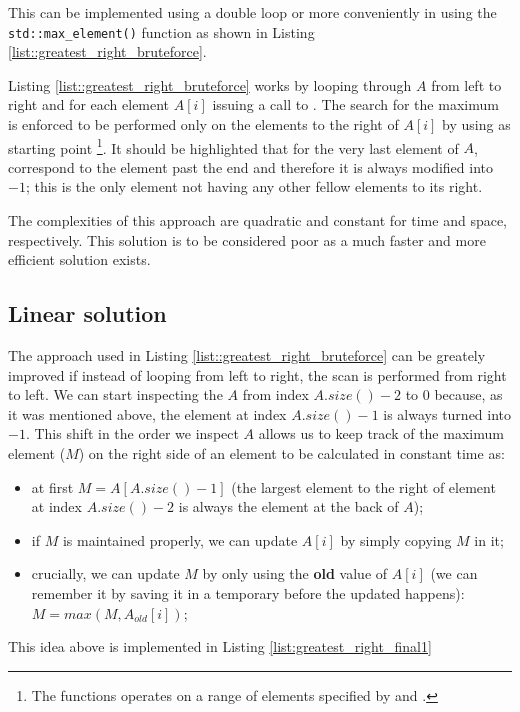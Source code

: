 This can be implemented using a double loop or more conveniently in \CC using the \texttt{std::max\_element()} function as shown in Listing \ref{list::greatest_right_bruteforce}. 



Listing \ref{list::greatest_right_bruteforce} works by looping through $A$ from left to right and for each element $A[i]$ issuing a call to . The search for the maximum is enforced to be performed only on the elements to the right of $A[i]$ by using as starting point \footnote{The  functions operates on a range of elements specified by  and  \cite{cit::std::maxelement}.}.
It should be highlighted that for the very last element of $A$,  correspond to the element past the end and therefore it is always modified into $-1$; this is the only element not having any other fellow elements to its right.

The complexities of this approach are quadratic and constant for time and space, respectively. 
This solution is to be considered poor as a much faster and more efficient solution exists.

\subsection{Linear solution}
\label{sec:greatest_right:linear}
The approach used in Listing \ref{list::greatest_right_bruteforce} can be greately improved if instead of looping from left to right, the scan is performed from right to left.
We can start inspecting the $A$ from index $A.size()-2$ to $0$ because, as it was mentioned above, the  element at index $A.size()-1$ is always turned into $-1$. 
This shift in the order we inspect $A$ allows us to keep track of the maximum element ($M$) on the right side of an element to be calculated in constant time as:
\begin{itemize}
	\item at first $M=A[A.size()-1]$ (the largest element to the right of element at index $A.size()-2$ is always the element at the back of $A$);
	\item if $M$ is maintained properly, we can update $A[i]$ by simply copying $M$ in it;
	\item crucially, we can update $M$ by only using the \textbf{old} value of $A[i]$ (we can remember it by saving it in a temporary before the updated happens): $M= max(M, A_{old}[i])$;
\end{itemize}
This idea above is implemented in Listing \ref{list:greatest_right_final1}

